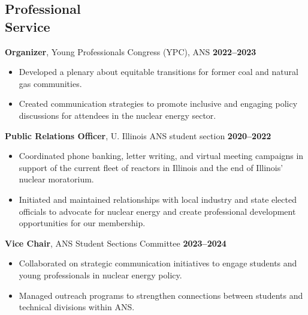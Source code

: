 \documentclass[margin,line]{resume}
\begin{document}
\begin{resume}
    \section{\mysidestyle Professional\\Service}

    \textbf{Organizer}, Young Professionals Congress (YPC), ANS \hfill \textbf{2022--2023}\vspace{.5mm}\\%
    \begin{itemize}
        \item Developed a plenary about equitable transitions for former coal and natural gas communities.
        \item Created communication strategies to promote inclusive and engaging policy discussions for attendees in the nuclear energy sector.
    \end{itemize}

    \textbf{Public Relations Officer}, U. Illinois ANS student section  \hfill \textbf{2020--2022}\vspace{.5mm}\\%
    \begin{itemize}
        \item Coordinated phone banking, letter writing, and virtual meeting campaigns in support of the current fleet of reactors in Illinois and the end of Illinois' nuclear moratorium.
        \item Initiated and maintained relationships with local industry and state elected officials to advocate for nuclear energy and create professional development opportunities for our membership.
    \end{itemize}

    \textbf{Vice Chair}, ANS Student Sections Committee  \hfill \textbf{2023--2024}\vspace{.5mm}\\%
    \begin{itemize}
        \item Collaborated on strategic communication initiatives to engage students and young professionals in nuclear energy policy.
        \item Managed outreach programs to strengthen connections between students and technical divisions within ANS.
    \end{itemize}

\end{resume}
\end{document}
